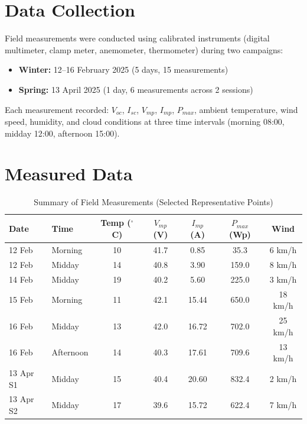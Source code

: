 \section{Data Collection}

Field measurements were conducted using calibrated instruments (digital multimeter, clamp meter, anemometer, thermometer) during two campaigns:
\begin{itemize}
    \item \textbf{Winter:} 12--16 February 2025 (5 days, 15 measurements)
    \item \textbf{Spring:} 13 April 2025 (1 day, 6 measurements across 2 sessions)
\end{itemize}

Each measurement recorded: $V_{oc}$, $I_{sc}$, $V_{mp}$, $I_{mp}$, $P_{max}$, ambient temperature, wind speed, humidity, and cloud conditions at three time intervals (morning 08:00, midday 12:00, afternoon 15:00).


\section{Measured Data}

\begin{table}[H]
\centering
\caption{Summary of Field Measurements (Selected Representative Points)}
\label{tab:short_data}
\small
\begin{tabular}{@{}l l c c c c c@{}}
\toprule
\textbf{Date} & \textbf{Time} & \textbf{Temp ($^{\circ}$C)} & \textbf{$V_{mp}$ (V)} & \textbf{$I_{mp}$ (A)} & \textbf{$P_{max}$ (Wp)} & \textbf{Wind} \\
\midrule
12 Feb & Morning & 10 & 41.7 & 0.85 & 35.3 & 6 km/h \\
12 Feb & Midday & 14 & 40.8 & 3.90 & 159.0 & 8 km/h \\
14 Feb & Midday & 19 & 40.2 & 5.60 & 225.0 & 3 km/h \\
15 Feb & Morning & 11 & 42.1 & 15.44 & 650.0 & 18 km/h \\
16 Feb & Midday & 13 & 42.0 & 16.72 & 702.0 & 25 km/h \\
16 Feb & Afternoon & 14 & 40.3 & 17.61 & 709.6 & 13 km/h \\
13 Apr S1 & Midday & 15 & 40.4 & 20.60 & 832.4 & 2 km/h \\
13 Apr S2 & Midday & 17 & 39.6 & 15.72 & 622.4 & 7 km/h \\
\bottomrule
\end{tabular}
\end{table}


